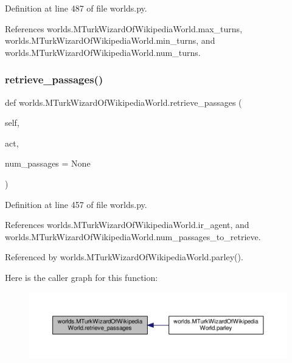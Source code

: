 Definition at line 487 of file worlds.\+py.



References worlds.\+M\+Turk\+Wizard\+Of\+Wikipedia\+World.\+max\+\_\+turns, worlds.\+M\+Turk\+Wizard\+Of\+Wikipedia\+World.\+min\+\_\+turns, and worlds.\+M\+Turk\+Wizard\+Of\+Wikipedia\+World.\+num\+\_\+turns.

\mbox{\label{classworlds_1_1MTurkWizardOfWikipediaWorld_a7c581b582a8770ebbf4b1c343dd68f3d}} 
\subsubsection{\texorpdfstring{retrieve\+\_\+passages()}{retrieve\_passages()}}
{\footnotesize\ttfamily def worlds.\+M\+Turk\+Wizard\+Of\+Wikipedia\+World.\+retrieve\+\_\+passages (\begin{DoxyParamCaption}\item[{}]{self,  }\item[{}]{act,  }\item[{}]{num\+\_\+passages = {\ttfamily None} }\end{DoxyParamCaption})}



Definition at line 457 of file worlds.\+py.



References worlds.\+M\+Turk\+Wizard\+Of\+Wikipedia\+World.\+ir\+\_\+agent, and worlds.\+M\+Turk\+Wizard\+Of\+Wikipedia\+World.\+num\+\_\+passages\+\_\+to\+\_\+retrieve.



Referenced by worlds.\+M\+Turk\+Wizard\+Of\+Wikipedia\+World.\+parley().

Here is the caller graph for this function\+:
\nopagebreak
\begin{figure}[H]
\begin{center}
\leavevmode
\includegraphics[width=350pt]{classworlds_1_1MTurkWizardOfWikipediaWorld_a7c581b582a8770ebbf4b1c343dd68f3d_icgraph}
\end{center}
\end{figure}
\mbox{\label{classworlds_1_1MTurkWizardOfWikipediaWorld_a909d3ecab331b3207e59f52a896cebe5}} 
